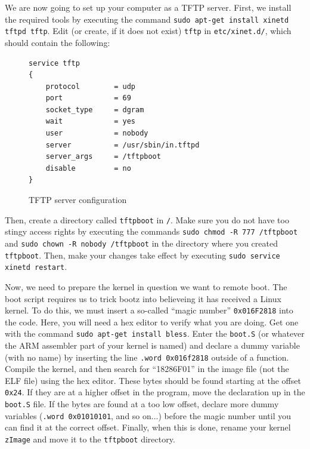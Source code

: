 \documentclass[a4paper,11pt,reqno]{amsart}
\begin{document}
We are now going to set up your computer as a TFTP server. First, we install the required tools by executing the command \texttt{sudo apt-get install xinetd tftpd tftp}. Edit (or create, if it does not exist) \texttt{tftp} in \texttt{etc/xinet.d/}, which should contain the following:

\begin{figure}[hb]
\begin{center}
\begin{BVerbatim}
service tftp
{
    protocol        = udp
    port            = 69
    socket_type     = dgram
    wait            = yes
    user            = nobody
    server          = /usr/sbin/in.tftpd
    server_args     = /tftpboot
    disable         = no
}
\end{BVerbatim}
\end{center}
\caption{TFTP server configuration}
\label{fig:server}
\end{figure}

Then, create a directory called \texttt{tftpboot} in \texttt{/}. Make sure you do not have too stingy access rights by executing the commands \texttt{sudo chmod -R 777 /tftpboot} and \texttt{sudo chown -R nobody /tftpboot} in the directory where you created \texttt{tftpboot}. Then, make your changes take effect by executing \texttt{sudo service xinetd restart}.

Now, we need to prepare the kernel in question we want to remote boot. The boot script requires us to trick bootz into believeing it has received a Linux kernel. To do this, we must insert a so-called ``magic number'' \texttt{0x016F2818} into the code. Here, you will need a hex editor to verify what you are doing. Get one with the command \texttt{sudo apt-get install bless}. Enter the \texttt{boot.S} (or whatever the ARM assembler part of your kernel is named) and declare a dummy variable (with no name) by inserting the line \texttt{.word 0x016f2818} outside of a function. Compile the kernel, and then search for ``18286F01'' in the image file (not the ELF file) using the hex editor. These bytes should be found starting at the offset \texttt{0x24}. If they are at a higher offset in the program, move the declaration up in the \texttt{boot.S} file. If the bytes are found at a too low offset, declare more dummy variables (\texttt{.word 0x01010101}, and so on...) before the magic number until you can find it at the correct offset. Finally, when this is done, rename your kernel \texttt{zImage} and move it to the \texttt{tftpboot} directory.
\end{document}

